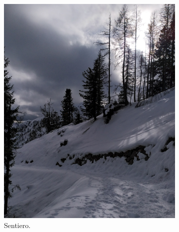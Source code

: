 \documentclass{article}
\begin{document}

\begin{figure}[htbp!]
    \centering
    \begin{subfigure}[b]{0.45\textwidth}
        \includegraphics[width=\textwidth]{images/foto_sentiero.jpg}
        \caption{Sentiero.}
    \end{subfigure}
    \hfill
    \begin{subfigure}[b]{0.45\textwidth}

\end{subfigure}
\end{figure}
\end{document}
